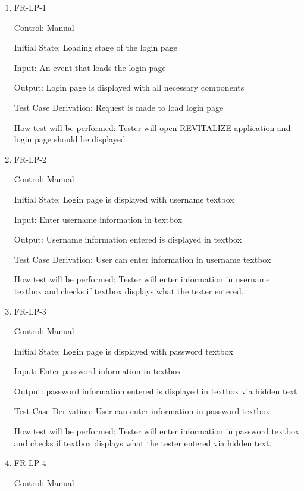 \documentclass[12pt, titlepage]{article}
\begin{document}
\begin{enumerate}
	
	\item{FR-LP-1\\}
	
	Control: Manual
	
	Initial State: Loading stage of the login page
	
	Input: An event that loads the login page
	
	Output: Login page is displayed with all necessary components
	
	Test Case Derivation: Request is made to load login page
	
	How test will be performed: Tester will open REVITALIZE application and login page should be displayed
	
	\item{FR-LP-2\\}
	
	Control: Manual
	
	Initial State: Login page is displayed with username textbox
	
	Input: Enter username information in textbox
	
	Output: Username information entered is displayed in textbox
	
	Test Case Derivation: User can enter information in username textbox
	
	How test will be performed: Tester will enter information in username textbox and checks if textbox displays what the tester entered.
	
	\item{FR-LP-3\\}
	
	Control: Manual
	
	Initial State: Login page is displayed with password textbox
	
	Input: Enter password information in textbox
	
	Output: password information entered is displayed in textbox via hidden text
	
	Test Case Derivation: User can enter information in password textbox
	
	How test will be performed: Tester will enter information in password textbox and checks if textbox displays what the tester entered via hidden text.
	
	\item{FR-LP-4\\}
	
	Control: Manual
	

\end{enumerate}
\end{document}
